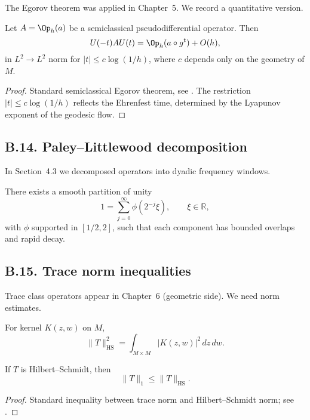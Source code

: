 \noindent
The Egorov theorem was applied in Chapter~5. We record a quantitative
version.

\begin{lemma}\label{lem:egorov}
Let $A=\Op_h(a)$ be a semiclassical pseudodifferential operator. Then
\[
U(-t) A U(t) = \Op_h(a\circ g^t) + O(h),
\]
in $L^2\to L^2$ norm for $|t|\le c\log(1/h)$, where $c$ depends only on the geometry of $M$.
\end{lemma}

\begin{proof}
Standard semiclassical Egorov theorem, see \cite{Zworski2012}. The restriction
$|t|\le c\log(1/h)$ reflects the Ehrenfest time, determined by the Lyapunov
exponent of the geodesic flow.
\end{proof}

\subsection*{B.14. Paley–Littlewood decomposition}

\noindent
In Section~4.3 we decomposed operators into dyadic frequency windows.

\begin{lemma}\label{lem:paley-littlewood}
There exists a smooth partition of unity
\[
1 = \sum_{j=0}^\infty \phi(2^{-j}\xi),\qquad \xi\in\mathbb R,
\]
with $\phi$ supported in $[1/2,2]$, such that each component has bounded
overlaps and rapid decay.
\end{lemma}

\subsection*{B.15. Trace norm inequalities}

\noindent
Trace class operators appear in Chapter~6 (geometric side). We need norm
estimates.

\begin{lemma}\label{lem:hilbert-schmidt}
For kernel $K(z,w)$ on $M$,
\[
\|T\|_{\mathrm{HS}}^2 = \int_{M\times M} |K(z,w)|^2\,dz\,dw.
\]
\end{lemma}

\begin{corollary}\label{cor:trace}
If $T$ is Hilbert–Schmidt, then
\[
\|T\|_1 \le \|T\|_{\mathrm{HS}}.
\]
\end{corollary}

\begin{proof}
Standard inequality between trace norm and Hilbert–Schmidt norm; see
\cite[Vol.~I]{ReedSimon1972}.
\end{proof}

